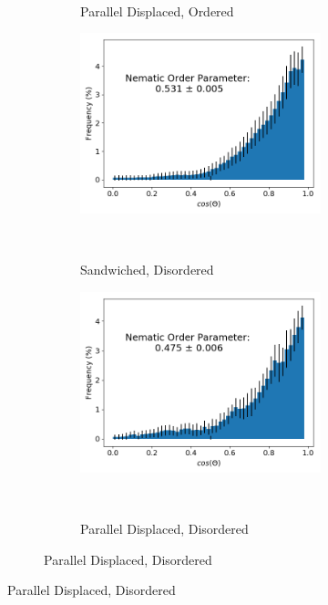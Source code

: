 \documentclass{article}
\begin{document}
\begin{figure}[!htb]
\begin{subfigure}{\linewidth}
\begin{subfigure}{0.45\linewidth}
                \caption{Parallel Displaced, Ordered}~\label{fig:offset_nematic}
        \end{subfigure}
        \begin{subfigure}{0.45\linewidth}
                \centering
                \includegraphics[width=\linewidth]{disorder_sandwich_nematic_order.png}
                \caption{Sandwiched, Disordered}~\label{fig:disorder_sandwich_nematic}
        \end{subfigure}%
        \begin{subfigure}{0.45\linewidth}
                \centering
                \includegraphics[width=\linewidth]{disorder_offset_nematic_order.png}
                \caption{Parallel Displaced, Disordered}~\label{fig:disorder_offset_nematic}

\end{subfigure}
\end{subfigure}
\end{figure}
\end{document}
